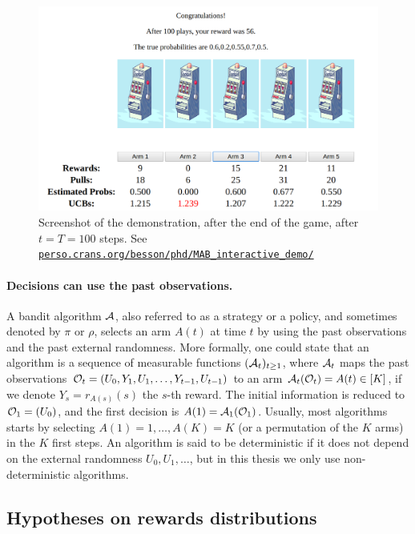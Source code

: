 \begin{figure}[h!]  %
    \centering
    \includegraphics[width=0.85\linewidth]{2-Chapters/2-Chapter/Images/example_of_a_5_arm_bandit_problem__step100.png}
    \caption{Screenshot of the demonstration, after the end of the game, after $t=T=100$ steps.  See \href{https://perso.crans.org/besson/phd/MAB\_interactive\_demo/}{\texttt{perso.crans.org/besson/phd/MAB\_interactive\_demo/}}}
    \label{fig:2:example_of_a_5_arm_bandit_problem__step100}
\end{figure}


\paragraph{Decisions can use the past observations.}

A bandit algorithm $\mathcal{A}$, also referred to as a strategy or a policy, and sometimes denoted by $\pi$ or $\rho$, selects an arm $A(t)$ at time $t$ by using the past observations and the past external randomness.
More formally, one could state that an algorithm is a sequence of measurable functions $(\mathcal{A}_t)_{t\geq1}$,
where $\mathcal{A}_t$ maps the past observations $\mathcal{O}_t = (U_0, Y_1, U_1, \dots, Y_{t-1}, U_{t-1})$
to an arm $\mathcal{A}_t(\mathcal{O}_t) = A(t) \in[K]$,
if we denote $Y_s = r_{A(s)}(s)$ the $s$-th reward.
The initial information is reduced to $\mathcal{O}_1 = (U_0)$, and the first decision is $A(1) = \mathcal{A}_1(\mathcal{O}_1)$. Usually, most algorithms starts by selecting $A(1)=1,\dots,A(K)=K$ (or a permutation of the $K$ arms) in the $K$ first steps.
%
An algorithm is said to be deterministic if it does not depend on the external randomness $U_0,U_1,\dots$, but in this thesis we only use non-deterministic algorithms.


\subsection{Hypotheses on rewards distributions}

